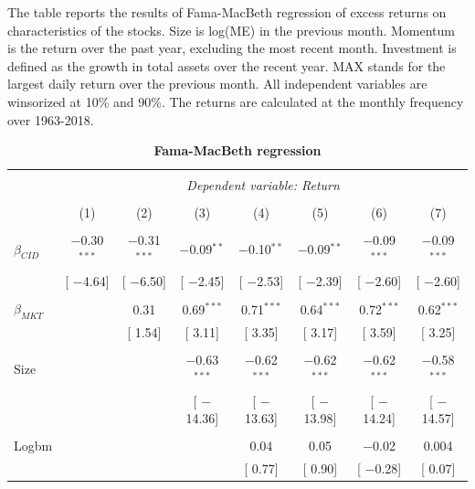 \documentclass[12pt]{article}
\begin{document}
\begin{table}[!htbp] \centering 
  \caption{\textbf{Fama-MacBeth regression}} 
  \label{} 
  \begin{flushleft}
    {\medskip\small
 The table reports the results of Fama-MacBeth regression of excess returns on characteristics of the stocks. Size is log(ME) in the previous month. Momentum is the return over the past year, excluding the most recent month. Investment is defined as the growth in total assets over the recent year. MAX stands for the largest daily return over the previous month. All independent variables are winsorized at 10\% and 90\%. The returns are calculated at the monthly frequency over 1963-2018.}
    \medskip
    \end{flushleft}
\begin{tabular}{@{\extracolsep{0pt}}lccccccc} 
\\[-1.8ex]\hline 
\hline \\[-1.8ex] 
 & \multicolumn{7}{c}{\textit{Dependent variable: Return}} \\ 
\cline{2-8} 
\\[-1.8ex] & (1) & (2) & (3) & (4) & (5) & (6) & (7)\\ 
\hline \\[-1.8ex] 
 $\beta_{CID}$ & $-$0.30$^{***}$ & $-$0.31$^{***}$ & $-$0.09$^{**}$ & $-$0.10$^{**}$ & $-$0.09$^{**}$ & $-$0.09$^{***}$ & $-$0.09$^{***}$ \\ 
  & [ $-$4.64] & [ $-$6.50] & [ $-$2.45] & [ $-$2.53] & [ $-$2.39] & [ $-$2.60] & [ $-$2.60] \\ 
  & & & & & & & \\ 
 $\beta_{MKT}$ &  & 0.31 & 0.69$^{***}$ & 0.71$^{***}$ & 0.64$^{***}$ & 0.72$^{***}$ & 0.62$^{***}$ \\ 
  &  & [ 1.54] & [ 3.11] & [ 3.35] & [ 3.17] & [ 3.59] & [ 3.25] \\ 
  & & & & & & & \\ 
 Size &  &  & $-$0.63$^{***}$ & $-$0.62$^{***}$ & $-$0.62$^{***}$ & $-$0.62$^{***}$ & $-$0.58$^{***}$ \\ 
  &  &  & [ $-$14.36] & [ $-$13.63] & [ $-$13.98] & [ $-$14.24] & [ $-$14.57] \\ 
  & & & & & & & \\ 
 Logbm &  &  &  & 0.04 & 0.05 & $-$0.02 & 0.004 \\ 
  &  &  &  & [ 0.77] & [ 0.90] & [ $-$0.28] & [ 0.07] \\ 

\end{tabular}
\end{table}
\end{document}
